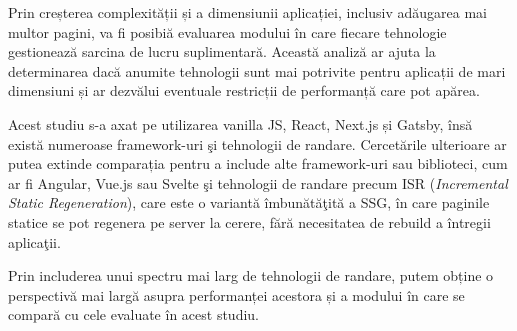\documentclass[12pt, a4paper]{report}
\begin{document}
Prin creșterea complexității și a dimensiunii aplicației, inclusiv ad\u augarea mai multor pagini, va fi posibi\u a evaluarea modului în care fiecare tehnologie gestionează sarcina de lucru suplimentară. Această analiză ar ajuta la determinarea dacă anumite tehnologii sunt mai potrivite pentru aplicații de mari dimensiuni și ar dezvălui eventuale restricții de performanță care pot apărea.

Acest studiu s-a axat pe utilizarea vanilla JS, React, Next.js și Gatsby, \^ins\u a există numeroase framework-uri \c si tehnologii de randare. Cercet\u arile ulterioare ar putea extinde comparația pentru a include alte framework-uri sau biblioteci, cum ar fi Angular, Vue.js sau Svelte \c si tehnologii de randare precum ISR (\textit{Incremental Static Regeneration}), care este o variant\u a \^imbun\u at\u a\c tit\u a a SSG, \^in care paginile statice se pot regenera pe server la cerere, f\u ar\u a necesitatea de rebuild a \^intregii aplica\c tii. 

Prin includerea unui spectru mai larg de tehnologii de randare, putem obține o perspectivă mai largă asupra performanței acestora și a modului în care se compară cu cele evaluate în acest studiu.



\renewcommand{\bibname}{Bibliografie}

\end{document}
